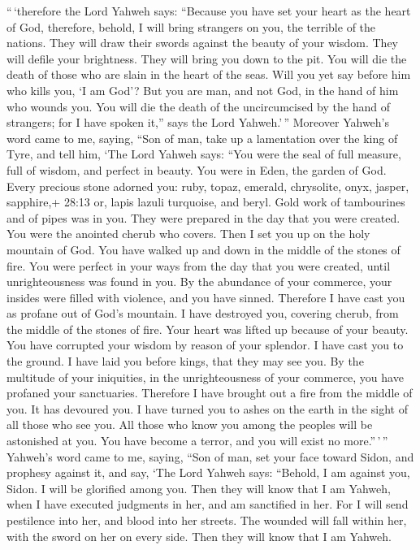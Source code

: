  ``\,`therefore the Lord Yahweh says: ``Because you have set
your heart as the heart of God,  therefore, behold, I will
bring strangers on you, the terrible of the nations. They will draw
their swords against the beauty of your wisdom. They will defile your
brightness.  They will bring you down to the pit. You will
die the death of those who are slain in the heart of the seas.
 Will you yet say before him who kills you, `I am God'? But
you are man, and not God, in the hand of him who wounds you.
 You will die the death of the uncircumcised by the hand of
strangers; for I have spoken it,'' says the Lord Yahweh.'\,''
 Moreover Yahweh's word came to me, saying, 
``Son of man, take up a lamentation over the king of Tyre, and tell him,
`The Lord Yahweh says: ``You were the seal of full measure, full of
wisdom, and perfect in beauty.  You were in Eden, the
garden of God. Every precious stone adorned you: ruby, topaz, emerald,
chrysolite, onyx, jasper, sapphire,+ 28:13 or, lapis lazuli turquoise,
and beryl. Gold work of tambourines and of pipes was in you. They were
prepared in the day that you were created.  You were the
anointed cherub who covers. Then I set you up on the holy mountain of
God. You have walked up and down in the middle of the stones of fire.
 You were perfect in your ways from the day that you were
created, until unrighteousness was found in you.  By the
abundance of your commerce, your insides were filled with violence, and
you have sinned. Therefore I have cast you as profane out of God's
mountain. I have destroyed you, covering cherub, from the middle of the
stones of fire.  Your heart was lifted up because of your
beauty. You have corrupted your wisdom by reason of your splendor. I
have cast you to the ground. I have laid you before kings, that they may
see you.  By the multitude of your iniquities, in the
unrighteousness of your commerce, you have profaned your sanctuaries.
Therefore I have brought out a fire from the middle of you. It has
devoured you. I have turned you to ashes on the earth in the sight of
all those who see you.  All those who know you among the
peoples will be astonished at you. You have become a terror, and you
will exist no more.''\,'\,''  Yahweh's word came to me,
saying,  ``Son of man, set your face toward Sidon, and
prophesy against it,  and say, `The Lord Yahweh says:
``Behold, I am against you, Sidon. I will be glorified among you. Then
they will know that I am Yahweh, when I have executed judgments in her,
and am sanctified in her.  For I will send pestilence into
her, and blood into her streets. The wounded will fall within her, with
the sword on her on every side. Then they will know that I am Yahweh.


